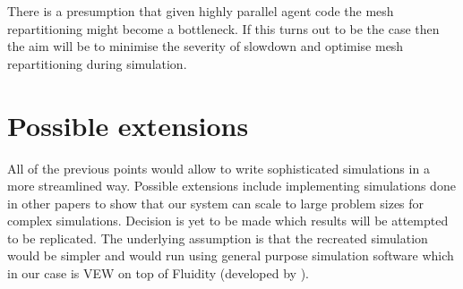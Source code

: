 \documentclass[12pt, a4paper]{report}
\begin{document}
There is a presumption that given highly parallel agent code the mesh repartitioning might become a bottleneck.
If this turns out to be the case then the aim will be to minimise the severity of slowdown and optimise
mesh repartitioning during simulation.

\section{Possible extensions}\label{sec:ext}

All of the previous points would allow to write sophisticated simulations in a more streamlined way. Possible
extensions include implementing simulations done in other papers to show that our system can scale to large
problem sizes for complex simulations. Decision is yet to be made which results will be attempted to be replicated.
The underlying assumption is that the recreated simulation would be simpler and would run using general purpose simulation
software which in our case is VEW on top of Fluidity (developed by \cite{FluidityVEW}).


 
\end{document}

